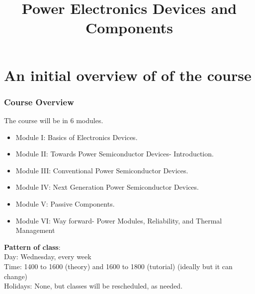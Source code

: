 \section{An initial overview of of the course}
\title[Initial overview]{Power Electronics Devices and Components}
 
\begin{frame}[plain]
    \titlepage
\end{frame}
\begin{frame}
	\frametitle{Course Overview}
The course will be in 6 modules.
		\begin{itemize}
		  \item Module I: Basics of Electronics Devices.
		  \item Module II: Towards Power Semiconductor Devices- Introduction.
		  \item Module III: Conventional Power Semiconductor Devices.
		  \item Module IV: Next Generation Power Semiconductor Devices.
		  \item Module V: Passive Components.
		  \item Module VI: Way forward- Power Modules, Reliability, and Thermal Management
		\end{itemize}
\textbf{Pattern of class}: \\ Day: Wednesday, every week \\ 
Time: 1400 to 1600 (theory) and 1600 to 1800 (tutorial) (ideally but it can change) \\
Holidays: None, but classes will be rescheduled, as needed. 
\end{frame}

